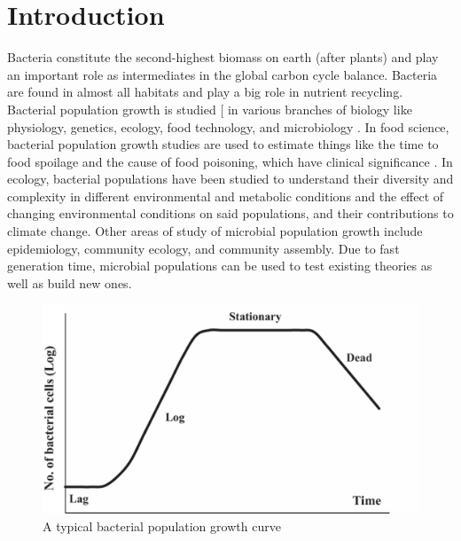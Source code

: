 \documentclass[11pt]{article}
\begin{document}
\newpage

\section{Introduction}

Bacteria constitute the second-highest biomass on earth (after plants) \cite{doi:10.1073/pnas.1711842115} and play an important role as intermediates in the global carbon cycle balance. Bacteria are found in almost all habitats and play a big role in nutrient recycling. Bacterial population growth is studied [\cite{monod1949growth} in various branches of biology like physiology, genetics, ecology, food technology, and microbiology \cite{Kovarova-Kovar1998-hz}. In food science, bacterial population growth studies are used to estimate things like the time to food spoilage and the cause of food poisoning, which have clinical significance \cite{doi:10.1080/10408398.2011.570463}. In ecology, bacterial populations have been studied to understand their diversity and complexity in different environmental and metabolic conditions and the effect of changing environmental conditions on said populations, and their contributions to climate change. Other areas of study of microbial population growth include epidemiology, community ecology, and community assembly. Due to fast generation time, microbial populations can be used to test existing theories as well as build new ones. 

\begin{figure}[!ht]
\centering
    \includegraphics[width=.8\textwidth]{../data/curve.pdf}  
\caption{A typical bacterial population growth curve \cite{Wang2015-gf}}
\label{fig:figc}
\end{figure}
\end{document}
